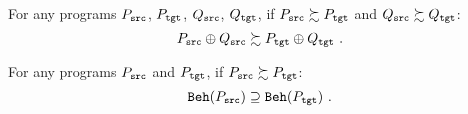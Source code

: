 \begin{theorem}[HorComp]
  For any programs $P_{\texttt{src}}$, $P_{\texttt{tgt}}$, $Q_{\texttt{src}}$, $Q_{\texttt{tgt}}$, if $P_{\texttt{src}} \succsim P_{\texttt{tgt}}$ and
  $Q_{\texttt{src}} \succsim Q_{\texttt{tgt}}$:
  \[
  \vspace{-0.8mm}
  P_\src \llink Q_\src \succsim P_\tgt \llink Q_\tgt~.
  \vspace{-0.8mm}
  \]
\end{theorem}
\begin{theorem}[Adequacy]
  For any programs $P_{\texttt{src}}$ and $P_{\texttt{tgt}}$, if $P_{\texttt{src}} \succsim P_{\texttt{tgt}}$:
  \[
  \vspace{-0.8mm}
  \beh{P_\src} \supseteq \beh{P_\tgt}~.
  \vspace{-0.8mm}
  \]
\end{theorem}







